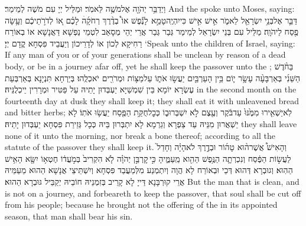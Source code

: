 {וַיְדַבֵּ֥ר יְהֹוָ֖ה אֶל\maqqaf מֹשֶׁ֥ה לֵּאמֹֽר׃}
{וּמַלֵּיל יְיָ עִם מֹשֶׁה לְמֵימַר׃}
{And the \lord\space spoke unto Moses, saying:}{}
{דַּבֵּ֛ר אֶל\maqqaf בְּנֵ֥י יִשְׂרָאֵ֖ל לֵאמֹ֑ר אִ֣ישׁ אִ֣ישׁ כִּי\maqqaf יִהְיֶֽה\maqqaf טָמֵ֣א \pasek  לָנֶ֡פֶשׁ אוֹ֩ בְדֶ֨רֶךְ רְחֹקָ֜הׄ לָכֶ֗ם א֚וֹ לְדֹרֹ֣תֵיכֶ֔ם וְעָ֥שָׂה פֶ֖סַח לַיהֹוָֽה׃}
{מַלֵּיל עִם בְּנֵי יִשְׂרָאֵל לְמֵימַר גְּבַר גְּבַר אֲרֵי יְהֵי מְסָאַב לִטְמֵי נַפְשָׁא דַּאֲנָשָׁא אוֹ בְאוֹרַח רַחִיקָא לְכוֹן אוֹ לְדָרֵיכוֹן וְיַעֲבֵיד פִּסְחָא קֳדָם יְיָ׃}
{‘Speak unto the children of Israel, saying: If any man of you or of your generations shall be unclean by reason of a dead body, or be in a journey afar off, yet he shall keep the passover unto the \lord;}{}
{בַּחֹ֨דֶשׁ הַשֵּׁנִ֜י בְּאַרְבָּעָ֨ה עָשָׂ֥ר י֛וֹם בֵּ֥ין הָעַרְבַּ֖יִם יַעֲשׂ֣וּ אֹת֑וֹ עַל\maqqaf מַצּ֥וֹת וּמְרֹרִ֖ים יֹאכְלֻֽהוּ׃}
{בְּיַרְחָא תִּנְיָנָא בְּאַרְבְּעַת עֶשְׂרָא יוֹמָא בֵּין שִׁמְשַׁיָּא יַעְבְּדוּן יָתֵיהּ עַל פַּטִּיר וּמְרָרִין יֵיכְלֻנֵּיהּ׃}
{in the second month on the fourteenth day at dusk they shall keep it; they shall eat it with unleavened bread and bitter herbs;}{}
{לֹֽא\maqqaf יַשְׁאִ֤ירוּ מִמֶּ֙נּוּ֙ עַד\maqqaf בֹּ֔קֶר וְעֶ֖צֶם לֹ֣א יִשְׁבְּרוּ\maqqaf ב֑וֹ כְּכׇל\maqqaf חֻקַּ֥ת הַפֶּ֖סַח יַעֲשׂ֥וּ אֹתֽוֹ׃}
{לָא יַשְׁאֲרוּן מִנֵּיהּ עַד צַפְרָא וְגַרְמָא לָא יִתְבְּרוּן בֵּיהּ כְּכָל גְּזֵירַת פִּסְחָא יַעְבְּדוּן יָתֵיהּ׃}
{they shall leave none of it unto the morning, nor break a bone thereof; according to all the statute of the passover they shall keep it.}{}
{וְהָאִישׁ֩ אֲשֶׁר\maqqaf ה֨וּא טָה֜וֹר וּבְדֶ֣רֶךְ לֹא\maqqaf הָיָ֗ה וְחָדַל֙ לַעֲשׂ֣וֹת הַפֶּ֔סַח וְנִכְרְתָ֛ה הַנֶּ֥פֶשׁ הַהִ֖וא מֵֽעַמֶּ֑יהָ כִּ֣י \legarmeh  קׇרְבַּ֣ן יְהֹוָ֗ה לֹ֤א הִקְרִיב֙ בְּמֹ֣עֲד֔וֹ חֶטְא֥וֹ יִשָּׂ֖א הָאִ֥ישׁ הַהֽוּא׃}
{וְגוּבְרָא דְּהוּא דְּכֵי וּבְאוֹרַח לָא הֲוָה וְיִתְמְנַע מִלְּמַעֲבַד פִּסְחָא וְיִשְׁתֵּיצֵי אֲנָשָׁא הַהוּא מֵעַמֵּיהּ אֲרֵי קוּרְבָּנָא דַּייָ לָא קָרֵיב בְּזִמְנֵיהּ חוֹבֵיהּ יְקַבֵּיל גּוּבְרָא הַהוּא׃}
{But the man that is clean, and is not on a journey, and forbeareth to keep the passover, that soul shall be cut off from his people; because he brought not the offering of the \lord\space in its appointed season, that man shall bear his sin.}{}
